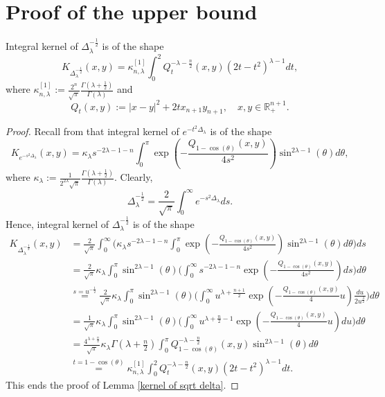 \documentclass{amsart}
\begin{document}
\section{Proof of the upper bound}\label{upper bound section}
\setcounter{equation}{0}
\begin{lemma}\label{kernel of sqrt delta} Integral kernel of $\Delta_{\lambda}^{-\frac12}$ is of the shape
$$K_{\Delta_{\lambda}^{-\frac12}}(x,y)=\kappa_{n,\lambda}^{[1]}\int_0^2Q_t^{-\lambda-\frac{n}{2}}(x,y)(2t-t^2)^{\lambda-1}dt,$$
where $\kappa_{n,\lambda}^{[1]}:=\frac{2^n}{\sqrt{\pi}}\frac{\Gamma(\lambda+\frac{1}{2})}{\Gamma(\lambda)}$ and
$$Q_t(x,y):=|x-y|^2+2tx_{n+1}y_{n+1},\quad x,y\in\mathbb{R}^{n+1}_+.$$
\end{lemma}
\begin{proof} Recall from \cite[formula (2.11)]{FLLXarxiv} that integral kernel of $e^{-t^2\Delta_{\lambda}}$ is of the shape
$$K_{e^{-s^2\Delta_{\lambda}}}(x,y)=\kappa_{\lambda}s^{-2\lambda-1-n}\int_0^{\pi}\exp(-\frac{Q_{1-\cos(\theta)}(x,y)}{4s^2})\sin^{2\lambda-1}(\theta)d\theta,$$
where $\kappa_\lambda:=\frac{1}{2^{2\lambda}\sqrt{\pi}}\frac{\Gamma(\lambda+\frac{1}{2})}{\Gamma(\lambda)}$. Clearly,
$$\Delta_{\lambda}^{-\frac12}=\frac{2}{\sqrt{\pi}}\int_0^{\infty}e^{-s^2\Delta_{\lambda}}ds.$$
Hence, integral kernel of $\Delta_{\lambda}^{-\frac12}$ is of the shape
\begin{align*}
K_{\Delta_{\lambda}^{-\frac12}}(x,y)&=\frac{2}{\sqrt{\pi}}\int_0^{\infty}\Big(\kappa_{\lambda}s^{-2\lambda-1-n}\int_0^{\pi}\exp(-\frac{Q_{1-\cos(\theta)}(x,y)}{4s^2})\sin^{2\lambda-1}(\theta)d\theta\Big)ds\\
&=\frac{2}{\sqrt{\pi}}\kappa_{\lambda}\int_0^{\pi}\sin^{2\lambda-1}(\theta)\Big(\int_0^{\infty}s^{-2\lambda-1-n}\exp(-\frac{Q_{1-\cos(\theta)}(x,y)}{4s^2})ds\Big)d\theta\\
&\stackrel{s=u^{-\frac12}}{=}\frac{2}{\sqrt{\pi}}\kappa_{\lambda}\int_0^{\pi}\sin^{2\lambda-1}(\theta)\Big(\int_0^{\infty}u^{\lambda+\frac{n+1}{2}}\exp(-\frac{Q_{1-\cos(\theta)}(x,y)}{4}u)\frac{du}{2u^{\frac32}}\Big)d\theta\\
&=\frac1{\sqrt{\pi}}\kappa_{\lambda}\int_0^{\pi}\sin^{2\lambda-1}(\theta)\Big(\int_0^{\infty}u^{\lambda+\frac{n}{2}-1}\exp(-\frac{Q_{1-\cos(\theta)}(x,y)}{4}u)du\Big)d\theta\\
&=\frac{4^{\lambda+\frac{n}{2}}}{\sqrt{\pi}}\kappa_{\lambda}\Gamma(\lambda+\frac{n}{2})\int_0^{\pi}Q_{1-\cos(\theta)}^{-\lambda-\frac{n}{2}}(x,y)\sin^{2\lambda-1}(\theta)d\theta\\
&\stackrel{t=1-\cos(\theta)}{=}\kappa_{n,\lambda}^{[1]}\int_0^2Q_t^{-\lambda-\frac{n}{2}}(x,y)(2t-t^2)^{\lambda-1}dt.
\end{align*}
This ends the proof of Lemma \ref{kernel of sqrt delta}.
\end{proof}
\end{document}
